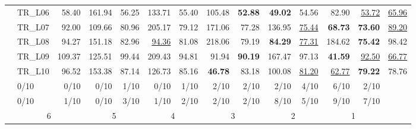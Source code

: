 \begin{table}[tp]
{\begin{tabular}{@{}cl*{6}{rr}@{}}
 & TR\_L06 & 58.40 & 161.94 & 56.25 & 133.71 & 55.40 & 105.48 & \textbf{52.88} & \textbf{49.02} & 54.56 & 82.90 & \underline{53.72} & \underline{65.96} \\
 & TR\_L07 & 92.00 & 109.66 & 80.96 & 205.17 & 79.12 & 171.06 & 77.28 & 136.95 & \underline{75.44} & \textbf{68.73} & \textbf{73.60} & \underline{89.20} \\
 & TR\_L08 & 94.27 & 151.18 & 82.96 & \underline{94.36} & 81.08 & 218.06 & 79.19 & \textbf{84.29} & \underline{77.31} & 184.62 & \textbf{75.42} & 98.42 \\
 & TR\_L09 & 109.37 & 125.51 & 99.44 & 209.43 & 94.81 & 91.94 & \textbf{90.19} & 167.47 & 97.13 & \textbf{41.59} & \underline{92.50} & \underline{66.77} \\
 & TR\_L10 & 96.52 & 153.38 & 87.14 & 126.73 & 85.16 & \textbf{46.78} & 83.18 & 100.08 & \underline{81.20} & \underline{62.77} & \textbf{79.22} & 78.76 \\
\rowcolor{black!7}
\multicolumn{2}{l}{Best count} & 0/10 & 0/10 & 0/10 & 1/10 & 0/10 & 1/10 & 2/10 & 2/10 & 2/10 & 4/10 & 6/10 & 2/10 \\
\rowcolor{black!7}
\multicolumn{2}{l}{Top-two count} & 0/10 & 1/10 & 0/10 & 3/10 & 1/10 & 2/10 & 2/10 & 2/10 & 8/10 & 5/10 & 9/10 & 7/10 \\
\rowcolor{black!7}
\multicolumn{2}{l}{Overall rank} & \multicolumn{2}{c}{6} & \multicolumn{2}{c}{5} & \multicolumn{2}{c}{4} & \multicolumn{2}{c}{3} & \multicolumn{2}{c}{2} & \multicolumn{2}{c}{1} \\
\bottomrule
\end{tabular}}


\end{table}
